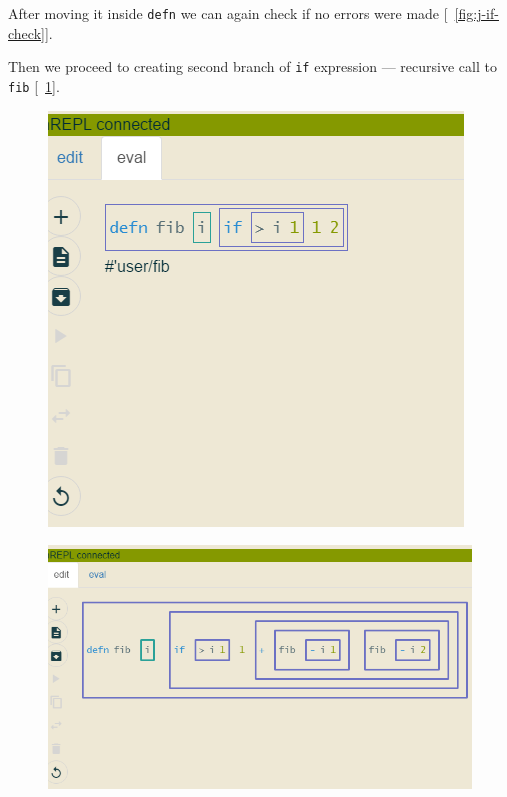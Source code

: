 \documentclass[11pt]{scrartcl}
\newcommand*{\figref}[1]{[\textbf{\figurename}~\ref{#1}]}
\begin{document}
After moving it inside \lstinline{defn} we can again check if no errors were
made \figref{fig:j-if-check}.

Then we proceed to creating second branch of \lstinline{if} expression ---
recursive call to \lstinline{fib} \figref{fig:j-fib-rec}.


\begin{figure}[hbt]
  \centering
  \begin{minipage}{0.48\textwidth}
    \centering
    \includegraphics[scale=0.3]{img/j-if-check}
\label{fig:j-if-check}
  \end{minipage}
  \begin{minipage}{0.48\textwidth}
    \centering
    \includegraphics[scale=0.3]{img/j-fib-rec}
\label{fig:j-fib-rec}
  \end{minipage}
\end{figure}
\end{document}
